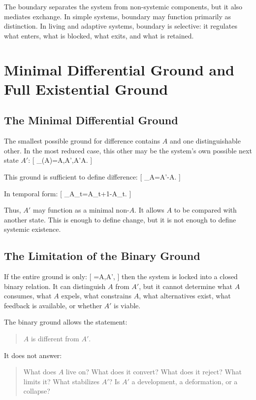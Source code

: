 \documentclass[11pt,a4paper]{article}
\begin{document}
The boundary separates the system from non-systemic components, but it also mediates exchange. In simple systems, boundary may function primarily as distinction. In living and adaptive systems, boundary is selective: it regulates what enters, what is blocked, what exits, and what is retained.

\section{Minimal Differential Ground and Full Existential Ground}

\subsection{The Minimal Differential Ground}

The smallest possible ground for difference contains $A$ and one distinguishable other. In the most reduced case, this other may be the system's own possible next state $A'$:
[
\Omega_{\Delta}(A)={A,A'},\quad A'\neq A.
]

This ground is sufficient to define difference:
[
\Delta_{\Omega}A=A'-A.
]

In temporal form:
[
\Delta_{\Omega}A_t=A_{t+1}-A_t.
]

Thus, $A'$ may function as a minimal non-$A$. It allows $A$ to be compared with another state. This is enough to define change, but it is not enough to define systemic existence.

\subsection{The Limitation of the Binary Ground}

If the entire ground is only:
[
\Omega={A,A'},
]
then the system is locked into a closed binary relation. It can distinguish $A$ from $A'$, but it cannot determine what $A$ consumes, what $A$ expels, what constrains $A$, what alternatives exist, what feedback is available, or whether $A'$ is viable.

The binary ground allows the statement:
\begin{quote}
$A$ is different from $A'$.
\end{quote}

It does not answer:
\begin{quote}
What does $A$ live on? What does it convert? What does it reject? What limits it? What stabilizes $A'$? Is $A'$ a development, a deformation, or a collapse?
\end{quote}
\end{document}
